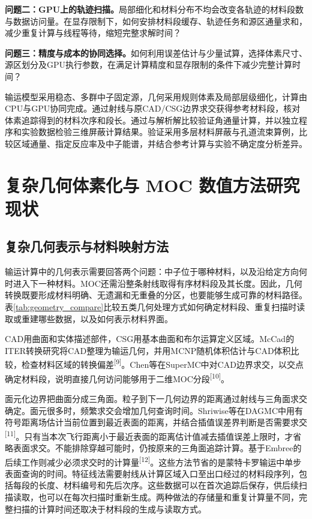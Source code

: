 \documentclass[UTF8, zihao=-4, fontset=none, a4paper]{ctexart}
\newcommand{\upcite}[1]{\textsuperscript{[#1]}}
\begin{document}
\textbf{问题二：GPU上的轨迹扫描。}局部细化和材料分布不均会改变各轨迹的材料段数与数据访问量。在显存限制下，如何安排材料段缓存、轨迹任务和源区通量求和，减少重复计算与线程等待，缩短完整求解时间？

\textbf{问题三：精度与成本的协同选择。}如何利用误差估计与少量试算，选择体素尺寸、源区划分及GPU执行参数，在满足计算精度和显存限制的条件下减少完整计算时间？

输运模型采用稳态、多群中子固定源，几何采用规则体素及局部层级细化，计算由CPU与GPU协同完成。通过射线与原CAD/CSG边界求交获得参考材料段，核对体素追踪得到的材料次序和段长。通过与解析解比较验证角通量计算，并以独立程序和实验数据检验三维屏蔽计算结果。验证采用多层材料屏蔽与孔道流束算例，比较区域通量、指定反应率及中子能谱，并结合参考计算与实验不确定度分析差异。

\section{复杂几何体素化与 MOC 数值方法研究现状}\label{sec:2}
\subsection{复杂几何表示与材料映射方法}
输运计算中的几何表示需要回答两个问题：中子位于哪种材料，以及沿给定方向何时进入下一种材料。MOC还需沿整条射线取得有序材料段及其长度。因此，几何转换既要形成材料明确、无遗漏和无重叠的分区，也要能够生成可靠的材料路径。表\ref{tab:geometry_compare}比较五类几何处理方式如何确定材料段、重复扫描时读取或重建哪些数据，以及如何表示材料界面。

CAD用曲面和实体描述部件，CSG用基本曲面和布尔运算定义区域。McCad的ITER转换研究将CAD整理为输运几何，并用MCNP随机体积估计与CAD体积比较，检查材料区域的转换偏差\upcite{9}。Chen等在SuperMC中对CAD边界求交，以交点确定材料段，说明直接几何访问能够用于二维MOC分段\upcite{10}。

面元化边界把曲面分成三角面。粒子到下一几何边界的距离通过射线与三角面求交确定。面元很多时，频繁求交会增加几何查询时间。Shriwise等在DAGMC中用有符号距离场估计当前位置到最近表面的距离，并结合插值误差界判断是否需要求交\upcite{11}。只有当本次飞行距离小于最近表面的距离估计值减去插值误差上限时，才省略表面求交。不能排除穿越可能时，仍按原来的三角面追踪计算。基于Embree的后续工作则减少必须求交时的计算量\upcite{12}。这些方法节省的是蒙特卡罗输运中单步表面查询的时间。特征线法需要射线从计算区域入口至出口经过的材料段序列，包括每段的长度、材料编号和先后次序。这些数据可以在首次追踪后保存，供后续扫描读取，也可以在每次扫描时重新生成。两种做法的存储量和重复计算量不同，完整扫描的计算时间还取决于材料段的生成与读取方式。
\end{document}
